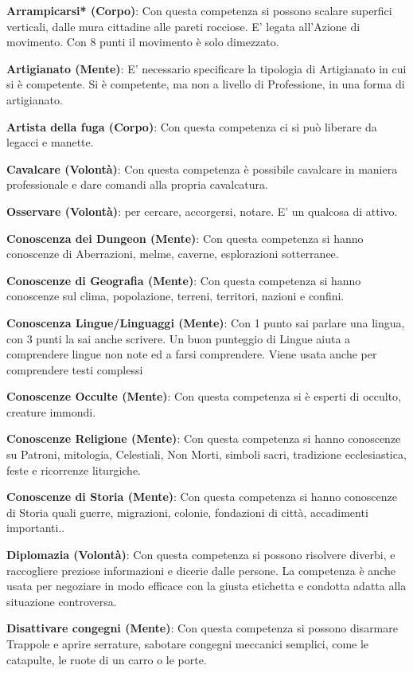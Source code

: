 \documentclass[12pt,a4paper,twoside,openany]{book}
\begin{document}
\begin{multicols}{2}
\textbf{Arrampicarsi* (Corpo)}: Con questa competenza si possono scalare superfici verticali, dalle mura cittadine alle pareti rocciose. E' legata all'Azione di movimento. Con 8 punti il movimento è solo dimezzato.

\textbf{Artigianato (Mente)}: E' necessario specificare la tipologia di Artigianato in cui si è competente. Si è competente, ma non a livello di Professione, in una forma di artigianato.

\textbf{Artista della fuga (Corpo)}: Con questa competenza ci si può liberare da legacci e manette.

\textbf{Cavalcare (Volontà)}: Con questa competenza è possibile cavalcare in maniera professionale e dare comandi alla propria cavalcatura. 

\textbf{Osservare (Volontà)}: per cercare, accorgersi, notare. E' un qualcosa di attivo.

\textbf{Conoscenza dei Dungeon (Mente)}: Con questa competenza si hanno conoscenze di Aberrazioni, melme, caverne, esplorazioni sotterranee.

\textbf{Conoscenze di Geografia (Mente)}: Con questa competenza si hanno conoscenze sul clima, popolazione, terreni, territori, nazioni e confini.

\textbf{Conoscenza Lingue/Linguaggi (Mente)}: Con 1 punto sai parlare una lingua, con 3 punti la sai anche scrivere. Un buon punteggio di Lingue aiuta a comprendere lingue non note ed a farsi comprendere. Viene usata anche per comprendere testi complessi

\textbf{Conoscenze Occulte (Mente)}: Con questa competenza si è esperti di occulto, creature immondi. 

\textbf{Conoscenze Religione (Mente)}: Con questa competenza si hanno conoscenze su Patroni, mitologia, Celestiali, Non Morti, simboli sacri, tradizione ecclesiastica, feste e ricorrenze liturgiche. 

\textbf{Conoscenze di Storia (Mente)}: Con questa competenza si hanno conoscenze di Storia quali guerre, migrazioni, colonie, fondazioni di città, accadimenti importanti..

\textbf{Diplomazia (Volontà)}: Con questa competenza si possono risolvere diverbi, e raccogliere preziose informazioni e dicerie dalle persone. La competenza è anche usata per negoziare in modo efficace con la giusta etichetta e condotta adatta alla situazione controversa. 

\textbf{Disattivare congegni (Mente)}: Con questa competenza si possono disarmare Trappole e aprire serrature, sabotare congegni meccanici semplici, come le catapulte, le ruote di un carro o le porte.


\end{multicols}
\end{document}
